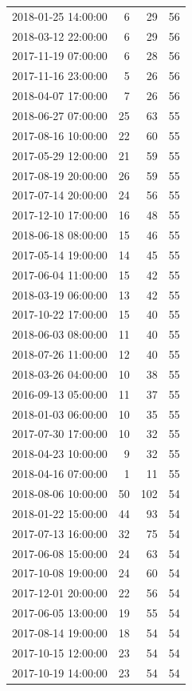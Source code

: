 \begin{tabular}{lrrr}
2018-01-25 14:00:00 & 6 & 29 & 56 \\
2018-03-12 22:00:00 & 6 & 29 & 56 \\
2017-11-19 07:00:00 & 6 & 28 & 56 \\
2017-11-16 23:00:00 & 5 & 26 & 56 \\
2018-04-07 17:00:00 & 7 & 26 & 56 \\
2018-06-27 07:00:00 & 25 & 63 & 55 \\
2017-08-16 10:00:00 & 22 & 60 & 55 \\
2017-05-29 12:00:00 & 21 & 59 & 55 \\
2017-08-19 20:00:00 & 26 & 59 & 55 \\
2017-07-14 20:00:00 & 24 & 56 & 55 \\
2017-12-10 17:00:00 & 16 & 48 & 55 \\
2018-06-18 08:00:00 & 15 & 46 & 55 \\
2017-05-14 19:00:00 & 14 & 45 & 55 \\
2017-06-04 11:00:00 & 15 & 42 & 55 \\
2018-03-19 06:00:00 & 13 & 42 & 55 \\
2017-10-22 17:00:00 & 15 & 40 & 55 \\
2018-06-03 08:00:00 & 11 & 40 & 55 \\
2018-07-26 11:00:00 & 12 & 40 & 55 \\
2018-03-26 04:00:00 & 10 & 38 & 55 \\
2016-09-13 05:00:00 & 11 & 37 & 55 \\
2018-01-03 06:00:00 & 10 & 35 & 55 \\
2017-07-30 17:00:00 & 10 & 32 & 55 \\
2018-04-23 10:00:00 & 9 & 32 & 55 \\
2018-04-16 07:00:00 & 1 & 11 & 55 \\
2018-08-06 10:00:00 & 50 & 102 & 54 \\
2018-01-22 15:00:00 & 44 & 93 & 54 \\
2017-07-13 16:00:00 & 32 & 75 & 54 \\
2017-06-08 15:00:00 & 24 & 63 & 54 \\
2017-10-08 19:00:00 & 24 & 60 & 54 \\
2017-12-01 20:00:00 & 22 & 56 & 54 \\
2017-06-05 13:00:00 & 19 & 55 & 54 \\
2017-08-14 19:00:00 & 18 & 54 & 54 \\
2017-10-15 12:00:00 & 23 & 54 & 54 \\
2017-10-19 14:00:00 & 23 & 54 & 54 \\

\end{tabular}
